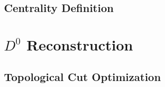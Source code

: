 \documentclass[a4paper]{article}
\begin{document}
%

\subsection{Centrality Definition}



\section{$D^0$ Reconstruction}

\subsection{Topological Cut Optimization}
\end{document}

